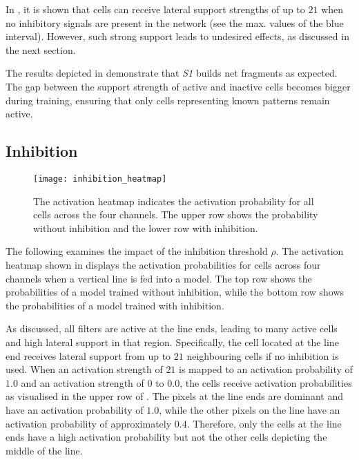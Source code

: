 In , it is shown that cells can receive lateral support strengths of up to $21$ when no inhibitory signals are present in the network (see the max. values of the blue interval).
However, such strong support leads to undesired effects, as discussed in the next section.

The results depicted in  demonstrate that \emph{S1} builds net fragments as expected. The gap between the support strength of active and inactive cells becomes bigger during training, ensuring that only cells representing known patterns remain active.

\subsection{Inhibition}
%
\begin{figure}[h]
    \centering
    \texttt{[image: inhibition\_heatmap]}
    \caption[Activation heatmap with and without inhibition]{The activation heatmap indicates the activation probability for all cells across the four channels. The upper row shows the probability without inhibition and the lower row with inhibition.}
\end{figure}
%
The following examines the impact of the inhibition threshold $\rho$. The activation heatmap shown in  displays the activation probabilities for cells across four channels when a vertical line is fed into a model.
The top row shows the probabilities of a model trained without inhibition, while the bottom row shows the probabilities of a model trained with inhibition.

As discussed, all filters are active at the line ends, leading to many active cells and high lateral support in that region.
Specifically, the cell located at the line end receives lateral support from up to $21$ neighbouring cells if no inhibition is used.
When an activation strength of $21$ is mapped to an activation probability of $1.0$ and an activation strength of $0$ to $0.0$, the cells receive activation probabilities as visualised in the upper row of .
The pixels at the line ends are dominant and have an activation probability of $1.0$, while the other pixels on the line have an activation probability of approximately $0.4$.
Therefore, only the cells at the line ends have a high activation probability but not the other cells depicting the middle of the line.

